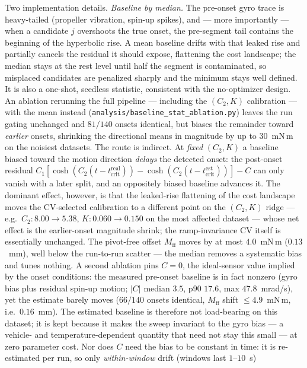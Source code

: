 \documentclass[10pt]{article}
\begin{document}
Two implementation details. \emph{Baseline by median.} The pre-onset
gyro trace is heavy-tailed (propeller vibration, spin-up spikes), and —
more importantly — when a candidate $j$ overshoots the true onset, the
pre-segment tail contains the beginning of the hyperbolic rise. A mean
baseline drifts with that leaked rise and partially cancels the residual
it should expose, flattening the cost landscape; the median stays at the
rest level until half the segment is contaminated, so misplaced
candidates are penalized sharply and the minimum stays well defined. It
is also a one-shot, seedless statistic, consistent with the
no-optimizer design. An ablation rerunning the full pipeline — including
the $(C_2, K)$ calibration — with the mean instead
(\texttt{analysis/baseline\_stat\_ablation.py}) leaves the run gating
unchanged and $81/140$ onsets identical, but biases the remainder toward
\emph{earlier} onsets, shrinking the directional means in magnitude by
up to $30$~mN\,m on the noisiest datasets. The route is indirect. At
\emph{fixed} $(C_2, K)$ a baseline biased toward the motion direction
\emph{delays} the detected onset: the post-onset residual
$C_1[\cosh(C_2(t - t_{\mathrm{crit}}^{\mathrm{real}}))
- \cosh(C_2(t - t_{\mathrm{crit}}^{\mathrm{est}}))] - C$ can only vanish
with a later split, and an oppositely biased baseline advances it. The
dominant effect, however, is that the leaked-rise flattening of the cost
landscape moves the CV-selected calibration to a different point on the
$(C_2, K)$ ridge — e.g.\ $C_2\!: 8.00 \to 5.38$, $K\!: 0.060 \to 0.150$
on the most affected dataset — whose net effect is the earlier-onset
magnitude shrink; the ramp-invariance CV itself is essentially
unchanged. The
pivot-free offset $M_{\mathrm{ff}}$ moves by at most $4.0$~mN\,m
($0.13$~mm), well below the run-to-run scatter — the median removes a
systematic bias and tunes nothing. A second ablation pins $C = 0$, the
ideal-sensor value implied by the onset conditions: the measured
pre-onset baseline is in fact nonzero (gyro bias plus residual spin-up
motion; $|C|$ median $3.5$, p90 $17.6$, max $47.8$~mrad/s), yet the
estimate barely moves ($66/140$ onsets identical,
$M_{\mathrm{ff}}$ shift $\le 4.9$~mN\,m, i.e.\ $0.16$~mm). The estimated baseline is
therefore not load-bearing on this dataset; it is kept because it makes
the sweep invariant to the gyro bias — a vehicle- and temperature-dependent
quantity that need not stay this small — at zero parameter cost. Nor
does $C$ need the bias to be constant in time: it is re-estimated per
run, so only \emph{within-window} drift (windows last $1$--$10$~s)
\end{document}
